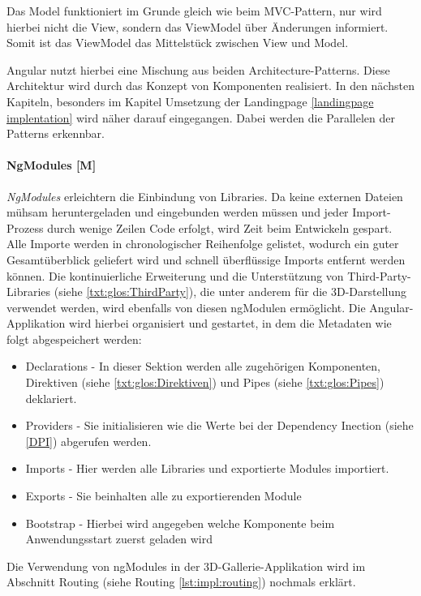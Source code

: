 Das Model funktioniert im Grunde gleich wie beim MVC-Pattern, nur wird hierbei nicht die View, sondern das ViewModel über Änderungen informiert. Somit ist das ViewModel das Mittelstück zwischen View und Model.

Angular nutzt hierbei eine Mischung aus beiden Architecture-Patterns. Diese Architektur wird durch das Konzept von Komponenten realisiert. In den nächsten Kapiteln, besonders im Kapitel Umsetzung der Landingpage \ref{landingpage implentation} wird näher darauf eingegangen. Dabei werden die Parallelen der Patterns erkennbar.
\cite{MVVM}

\paragraph{NgModules [M]}\label{sec:NgModules}
\emph{NgModules} erleichtern die Einbindung von Libraries. Da keine externen Dateien mühsam heruntergeladen und eingebunden werden müssen und jeder Import-Prozess durch wenige Zeilen Code erfolgt, wird Zeit beim Entwickeln gespart. Alle Importe werden in chronologischer Reihenfolge gelistet, wodurch ein guter Gesamtüberblick geliefert wird und schnell überflüssige Imports entfernt werden können. Die kontinuierliche Erweiterung und die Unterstützung von Third-Party-Libraries (siehe \ref{txt:glos:ThirdParty}), die unter anderem für die 3D-Darstellung verwendet werden, wird ebenfalls von diesen ngModulen ermöglicht. Die Angular-Applikation wird hierbei organisiert und gestartet, in dem die Metadaten wie folgt abgespeichert werden:

\begin{itemize}
  \item Declarations - In dieser Sektion werden alle zugehörigen Komponenten, Direktiven (siehe \ref{txt:glos:Direktiven}) und Pipes (siehe \ref{txt:glos:Pipes}) deklariert. 
  \item Providers - Sie initialisieren wie die Werte bei der Dependency Inection (siehe \ref{DPI}) abgerufen werden. \cite{AngularProviders}
  \item Imports - Hier werden alle Libraries und exportierte Modules importiert.
  \item Exports - Sie beinhalten alle zu exportierenden Module
  \item Bootstrap - Hierbei wird angegeben welche Komponente beim Anwendungsstart zuerst geladen wird
\end{itemize}

Die Verwendung von ngModules in der 3D-Gallerie-Applikation wird im Abschnitt Routing (siehe Routing \ref{lst:impl:routing}) nochmals erklärt.
\cite{AngularNgModules}
\cite{AngularNgModulesAPI}
\cite{AngularBuch}


